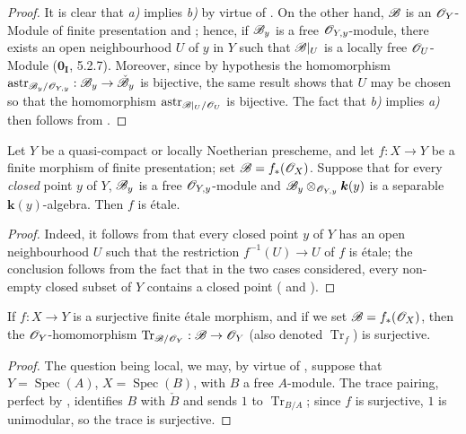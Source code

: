 \begin{proof}
It is clear that \emph{a)} implies \emph{b)} by virtue of .
On the other hand, $\mathscr{B}$ is an $\mathscr{O}_Y$-Module of finite presentation  and ; hence, if $\mathscr{B}_y$ is a free $\mathscr{O}_{Y,y}$-module, there exists an open neighbourhood $U$ of $y$ in $Y$ such that $\mathscr{B}|_U$ is a locally free $\mathscr{O}_U$-Module ($\mathbf{0}_{\mathbf I}$, 5.2.7).  Moreover, since by hypothesis the homomorphism $\operatorname{astr}_{\mathscr{B}_y/\mathscr{O}_{Y,y}}:\mathscr{B}_y\to\check{\mathscr{B}}_y$ is bijective, the same result shows that $U$ may be chosen so that
the homomorphism $\operatorname{astr}_{\mathscr{B}|_U/\mathscr{O}_U}$ is bijective.
The fact that \emph{b)} implies \emph{a)} then follows from .
\end{proof}

\begin{corollary}[18.2.5]
\label{IV.18.2.5}
Let $Y$ be a quasi-compact or locally Noetherian prescheme, and let $f:X\to Y$ be a finite morphism of finite presentation;
set $\mathscr{B}=f_*(\mathscr{O}_X)$.
Suppose that for every \emph{closed} point $y$ of $Y$, $\mathscr{B}_y$ is a free $\mathscr{O}_{Y,y}$-module and $\mathscr{B}_y\otimes_{\mathscr{O}_{Y,y}}\boldsymbol{k}(y)$ is a separable $\boldsymbol{k}(y)$-algebra.
Then $f$ is \'etale.
\end{corollary}

\begin{proof}
Indeed, it follows from  that every closed point $y$ of $Y$ has an open neighbourhood $U$ such that the restriction $f^{-1}(U)\to U$ of $f$ is \'etale;
the conclusion follows from the fact that in the two cases considered, every non-empty closed subset of $Y$ contains a closed point ( and ).
\end{proof}

\begin{corollary}[18.2.6]
\label{IV.18.2.6}
If $f:X\to Y$ is a surjective finite \'etale morphism, and if we set $\mathscr{B}=f_*(\mathscr{O}_X)$, then the $\mathscr{O}_Y$-homomorphism $\operatorname{Tr}_{\mathscr{B}/\mathscr{O}_Y}:\mathscr{B}\to\mathscr{O}_Y$  \textup{(also denoted $\operatorname{Tr}_f$)} is surjective.
\end{corollary}

\begin{proof}
The question being local, we may, by virtue of , suppose that $Y=\operatorname{Spec}(A)$, $X=\operatorname{Spec}(B)$, with $B$ a free $A$-module.
The trace pairing, perfect by , identifies $B$ with $\check{B}$ and sends $1$ to $\operatorname{Tr}_{B/A}$; since $f$ is surjective, $1$ is unimodular, so the trace is surjective.
\end{proof}

